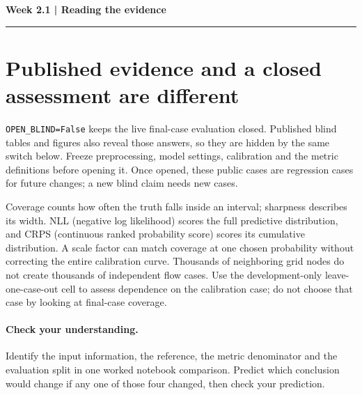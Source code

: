 \documentclass[11pt]{article}
\begin{document}
\noindent\textbf{Week 2.1 | Reading the evidence}\par\medskip\hrule\medskip
\section*{Published evidence and a closed assessment are different}
\texttt{OPEN\_BLIND=False} keeps the live final-case evaluation closed. Published blind
tables and figures also reveal those answers, so they are hidden by the same
switch below. Freeze preprocessing, model settings, calibration and the metric
definitions before opening it. Once opened, these public cases are regression
cases for future changes; a new blind claim needs new cases.

Coverage counts how often the truth falls inside an interval; sharpness describes
its width. NLL (negative log likelihood) scores the full predictive distribution,
and CRPS (continuous ranked probability score) scores its cumulative distribution.
A scale factor can match coverage at one chosen probability without correcting
the entire calibration curve. Thousands of neighboring grid nodes do not create
thousands of independent flow cases. Use the development-only leave-one-case-out
cell to assess dependence on the calibration case; do not choose that case by
looking at final-case coverage.
\paragraph{Check your understanding.}
Identify the input information, the reference, the metric denominator and the
evaluation split in one worked notebook comparison. Predict which conclusion
would change if any one of those four changed, then check your prediction.
\end{document}
